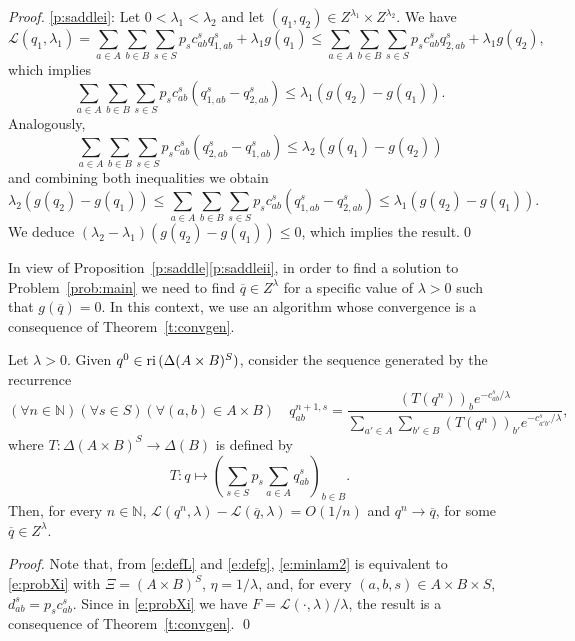 \documentclass[smallextended,referee,envcountsect,]{svjour3}
\newcommand{\reli}{\ensuremath{\text{\rm ri}\,}}
\newcommand{\NN}{{\mathbb N}}
\begin{document}
\begin{proof}
\ref{p:saddlei}: 
Let $0<\lambda_1<\lambda_2$ and let
$(q_1,q_2)\in 
Z^{\lambda_1}\times Z^{\lambda_2}$. We have
\begin{equation}
\mathcal{L}(q_1,\lambda_1)=\sum_{a\in A}\sum_{b\in B}\sum_{s\in 
S}p_sc_{ab}^sq_{1,ab}^s+\lambda_1 g(q_1)\le
\sum_{a\in A}\sum_{b\in B}\sum_{s\in 
S}p_sc_{ab}^sq_{2,ab}^s+\lambda_1 g(q_2), 
\end{equation} 
which implies
\begin{equation}
\sum_{a\in A}\sum_{b\in B}\sum_{s\in 
S}p_sc_{ab}^s(q_{1,ab}^s-q_{2,ab}^s)\le 
\lambda_1(g(q_2)-g(q_1)).
\end{equation}
Analogously,
\begin{equation}
\sum_{a\in A}\sum_{b\in B}\sum_{s\in 
S}p_sc_{ab}^s(q_{2,ab}^s-q_{1,ab}^s)\le \lambda_2(g(q_1)-g(q_2))
\end{equation}
and combining both inequalities we obtain
\begin{equation}
\label{e:auxine}
\lambda_2(g(q_2)-g(q_1))\le \sum_{a\in A}\sum_{b\in B}\sum_{s\in 
S}p_sc_{ab}^s(q_{1,ab}^s-q_{2,ab}^s)\le 
\lambda_1(g(q_2)-g(q_1)).
\end{equation}
We deduce $(\lambda_2-\lambda_1)(g(q_2)-g(q_1))\le 0$, which 
implies {the result}.\qed
\end{proof}
In view of Proposition~\ref{p:saddle}\eqref{p:saddleii}, in order to 
find a solution to Problem~\ref{prob:main} we need to find 
$\overline{q}\in Z^{\lambda}$ for a specific value of $\lambda>0$ 
such that $g(\overline{q})=0$. {In this context, we} use an 
algorithm whose 
convergence is a consequence of Theorem~\ref{t:convgen}.
\begin{theorem}
\label{t:propPFqlam}
Let $\lambda>0${. Given $q^0\in\reli (\Delta(A\times B)^S)$, 
consider the sequence generated 
by the recurrence 
\begin{equation}
\label{e:defPFqlam}
(\forall n\in\NN)(\forall s\in S)(\forall (a,b)\in A\times B)\quad 
q_{ab}^{n+1,s}=
\displaystyle{\frac{(T(q^n))_be^{-c_{ab}^s/\lambda}}{
\displaystyle{\sum_{a'\in
A}}\displaystyle{\sum_{b'\in 
B}}(T(q^n))_{b'}e^{-c_{a'b'}^s/\lambda}}},
\end{equation}
where $T\colon\Delta(A\times B)^S\to 
\Delta(B)$ is defined by 
\begin{equation}
\label{e:T}
T\colon 
q\mapsto \left(\sum_{s\in 
S}p_s\sum_{a\in A}q_{ab}^s\right)_{b\in B}.
\end{equation}
Then, for every $n\in\NN$, 
$\mathcal{L}(q^n,\lambda)-\mathcal{L}(\overline{q},\lambda)=O(1/n)$ 
and 
$q^n\to \overline{q}$, for some $\overline{q}\in Z^{\lambda}$.
}

\end{theorem}
\begin{proof} 
Note that, from \eqref{e:defL} and \eqref{e:defg},
\eqref{e:minlam2} is equivalent to \eqref{e:probXi} with 
$\Xi=(A\times B)^S$, $\eta=1/\lambda$, and, for every 
$(a,b,s)\in A\times B\times S$, $d_{ab}^s=p_sc_{ab}^s$.
Since in \eqref{e:probXi} we have 
$F=\mathcal{L}(\cdot,\lambda)/\lambda$, the result is a
consequence of Theorem~\ref{t:convgen}. 
\qed
\end{proof}
\end{document}

